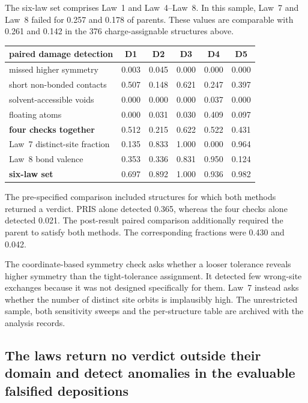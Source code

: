 The six-law set comprises Law~1 and Law~4--Law~8. In this sample, Law~7 and Law~8
failed for 0.257 and 0.178 of parents. These values are comparable with 0.261 and
0.142 in the 376 charge-assignable structures above.

\begin{center}
\begin{tabular}{lccccc}
\hline
paired damage detection & D1 & D2 & D3 & D4 & D5 \\
\hline
missed higher symmetry & 0.003 & 0.045 & 0.000 & 0.000 & 0.000 \\
short non-bonded contacts & 0.507 & 0.148 & 0.621 & 0.247 & 0.397 \\
solvent-accessible voids & 0.000 & 0.000 & 0.000 & 0.037 & 0.000 \\
floating atoms & 0.000 & 0.031 & 0.030 & 0.409 & 0.097 \\
\textbf{four checks together} & 0.512 & 0.215 & 0.622 & 0.522 & 0.431 \\
\hline
Law~7 distinct-site fraction & 0.135 & 0.833 & 1.000 & 0.000 & 0.964 \\
Law~8 bond valence & 0.353 & 0.336 & 0.831 & 0.950 & 0.124 \\
\textbf{six-law set} & 0.697 & 0.892 & 1.000 & 0.936 & 0.982 \\
\hline
\end{tabular}
\end{center}

The pre-specified comparison included structures for which both methods returned
a verdict. PRIS alone detected 0.365, whereas the four checks alone detected
0.021. The post-result paired comparison additionally required the parent to
satisfy both methods. The corresponding fractions were 0.430 and 0.042.

The coordinate-based symmetry check asks whether a looser tolerance reveals
higher symmetry than the tight-tolerance assignment. It detected few wrong-site
exchanges because it was not designed specifically for them. Law~7 instead asks
whether the number of distinct site orbits is implausibly high.
The unrestricted sample, both sensitivity sweeps and the per-structure table are
archived with the analysis records.

\subsection{The laws return no verdict outside their domain and detect anomalies in the evaluable falsified depositions}
\label{s17.x-realworld}

